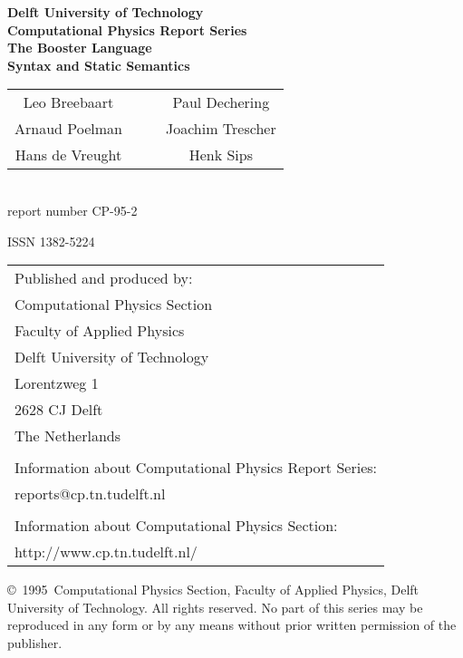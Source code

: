 \newcommand{\cptitle}{The Booster Language\\Syntax and Static Semantics}
\newcommand{\cpauthors}{
\begin{tabular}{ccc}
Leo Breebaart  & $\quad$ & Paul Dechering\\
Arnaud Poelman & 	 & Joachim Trescher\\
Hans de Vreught& 	 & Henk Sips\\
\end{tabular}}
\newcommand{\cpyear}{95}
\newcommand{\cpnumber}{2}
\newcommand{\cpissn}{1382-5224}

\begin{titlepage}
\thispagestyle{empty}
\begin{center}
\bfseries
\Large
Delft University of Technology \\
Computational Physics Report Series \\[2\baselineskip]
{\huge \cptitle} \\[\baselineskip]
{\large\normalfont \cpauthors} \\[2\baselineskip]
report number  CP-\cpyear-\cpnumber \\
\vfill
\begin{figure}[htbp]
  \begin{center}
    \mbox{}
  \end{center}
\end{figure}
\vfill
ISSN \cpissn
\end{center}
\pagebreak
\thispagestyle{empty}
\noindent
\begin{tabular}{l}
Published and produced by: \\
Computational Physics Section \\
Faculty of Applied Physics \\
Delft University of Technology \\
Lorentzweg 1 \\
2628 CJ  Delft \\
The Netherlands \\
 \\
Information about Computational Physics Report Series: \\
\textsf{reports@cp.tn.tudelft.nl} \\
 \\
Information about Computational Physics Section: \\
\textsf{http://www.cp.tn.tudelft.nl/} \\
\end{tabular}
\vfill
\noindent
\copyright\ 19\cpyear\ Computational Physics Section, Faculty of Applied
Physics, Delft University of Technology. All rights reserved. No part of this
series may be reproduced in any form or by any means without prior written
permission of the publisher.
\end{titlepage}
